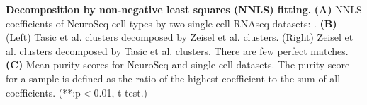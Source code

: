 \textbf{Decomposition by non-negative least squares (NNLS) fitting.}
\textbf{(A)} NNLS coefficients of NeuroSeq cell types by two single cell RNAseq datasets: \citep{Zeisel_2015,Tasic_2016}.
\textbf{(B)} (Left) Tasic et al. clusters decomposed by Zeisel et al. clusters. (Right) Zeisel et al. clusters decomposed by Tasic et al. clusters. There are few perfect matches.
\textbf{(C)} Mean purity scores for NeuroSeq and single cell datasets. The purity score for a sample is defined as the ratio of the highest coefficient to the sum of all coefficients. (**:p$<$0.01, t-test.)